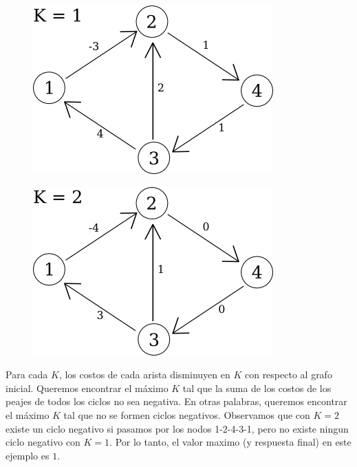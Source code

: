 \begin{figure}[H]
	\centering
	\begin{minipage}[b]{0.45\textwidth}
		\includegraphics[width=\textwidth]{imagenes/problema2/prob2_caso3_c1.png} \\
	\end{minipage}
	\hfill
	\begin{minipage}[b]{0.45\textwidth}
		\includegraphics[width=\textwidth]{imagenes/problema2/prob2_caso3_c2.png} \\
	\end{minipage}
\end{figure}

Para cada $K$, los costos de cada arista disminuyen en $K$ con respecto al grafo inicial. Queremos encontrar el máximo $K$ tal que la suma de los costos de los peajes de todos los ciclos no sea negativa. En otras palabras, queremos encontrar el máximo $K$ tal que no se formen ciclos negativos. Observamos que con $K = 2$ existe un ciclo negativo si pasamos por los nodos 1-2-4-3-1, pero no existe ningun ciclo negativo con $K = 1$. Por lo tanto, el valor maximo (y respuesta final) en este ejemplo es $1$. \\


